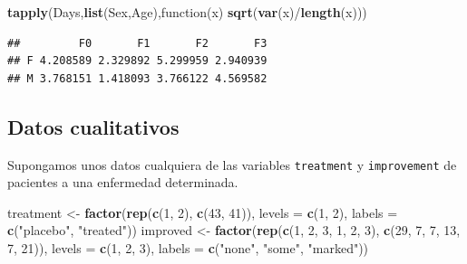 \documentclass[]{article}
\newenvironment{Shaded}{\begin{snugshade}}{\end{snugshade}}
\newcommand{\KeywordTok}[1]{\textcolor[rgb]{0.13,0.29,0.53}{\textbf{{#1}}}}
\newcommand{\DataTypeTok}[1]{\textcolor[rgb]{0.13,0.29,0.53}{{#1}}}
\newcommand{\DecValTok}[1]{\textcolor[rgb]{0.00,0.00,0.81}{{#1}}}
\newcommand{\StringTok}[1]{\textcolor[rgb]{0.31,0.60,0.02}{{#1}}}
\newcommand{\NormalTok}[1]{{#1}}
\numberwithin{equation}{section}
\begin{document}
\begin{Shaded}
\begin{Highlighting}[]
\KeywordTok{tapply}\NormalTok{(Days,}\KeywordTok{list}\NormalTok{(Sex,Age),function(x) }\KeywordTok{sqrt}\NormalTok{(}\KeywordTok{var}\NormalTok{(x)/}\KeywordTok{length}\NormalTok{(x)))}
\end{Highlighting}
\end{Shaded}

\begin{verbatim}
##         F0       F1       F2       F3
## F 4.208589 2.329892 5.299959 2.940939
## M 3.768151 1.418093 3.766122 4.569582
\end{verbatim}

\subsection{Datos cualitativos}\label{datos-cualitativos}

Supongamos unos datos cualquiera de las variables \texttt{treatment} y
\texttt{improvement} de pacientes a una enfermedad determinada.

\begin{Shaded}
\begin{Highlighting}[]
\NormalTok{treatment <-}\StringTok{ }\KeywordTok{factor}\NormalTok{(}\KeywordTok{rep}\NormalTok{(}\KeywordTok{c}\NormalTok{(}\DecValTok{1}\NormalTok{, }\DecValTok{2}\NormalTok{), }\KeywordTok{c}\NormalTok{(}\DecValTok{43}\NormalTok{, }\DecValTok{41}\NormalTok{)), }\DataTypeTok{levels =} \KeywordTok{c}\NormalTok{(}\DecValTok{1}\NormalTok{, }\DecValTok{2}\NormalTok{),}
                    \DataTypeTok{labels =} \KeywordTok{c}\NormalTok{(}\StringTok{"placebo"}\NormalTok{, }\StringTok{"treated"}\NormalTok{))}
\NormalTok{improved <-}\StringTok{ }\KeywordTok{factor}\NormalTok{(}\KeywordTok{rep}\NormalTok{(}\KeywordTok{c}\NormalTok{(}\DecValTok{1}\NormalTok{, }\DecValTok{2}\NormalTok{, }\DecValTok{3}\NormalTok{, }\DecValTok{1}\NormalTok{, }\DecValTok{2}\NormalTok{, }\DecValTok{3}\NormalTok{), }\KeywordTok{c}\NormalTok{(}\DecValTok{29}\NormalTok{, }\DecValTok{7}\NormalTok{, }\DecValTok{7}\NormalTok{, }\DecValTok{13}\NormalTok{, }\DecValTok{7}\NormalTok{, }\DecValTok{21}\NormalTok{)),}
                   \DataTypeTok{levels =} \KeywordTok{c}\NormalTok{(}\DecValTok{1}\NormalTok{, }\DecValTok{2}\NormalTok{, }\DecValTok{3}\NormalTok{),}
                   \DataTypeTok{labels =} \KeywordTok{c}\NormalTok{(}\StringTok{"none"}\NormalTok{, }\StringTok{"some"}\NormalTok{, }\StringTok{"marked"}\NormalTok{))}
\end{Highlighting}
\end{Shaded}
\end{document}
